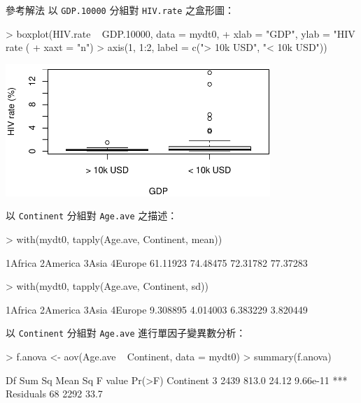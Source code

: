 \documentclass[14pt, aspectratio=43]{beamer}
\begin{document}
\begin{frame}{參考解法}
以 \verb+GDP.10000+ 分組對 \verb+HIV.rate+ 之盒形圖：
\begin{RC}
> boxplot(HIV.rate ~ GDP.10000, data = mydt0,
+         xlab = "GDP", ylab = "HIV rate (%
+         xaxt = "n")
> axis(1, 1:2, label = c("> 10k USD", "< 10k USD"))
\end{RC}
\begin{center}\includegraphics[width=0.75\textwidth]{Rplot-test-two-group.pdf}\end{center}

\framebreak

以 \verb+Continent+ 分組對 \verb+Age.ave+ 之描述：
\begin{RC}
> with(mydt0, {tapply(Age.ave, Continent, mean)})
\end{RC}
\begin{R}
 1Africa 2America    3Asia  4Europe 
61.11923 74.48475 72.31782 77.37283 
\end{R}
\begin{RC}
> with(mydt0, {tapply(Age.ave, Continent, sd)})
\end{RC}
\begin{R}
 1Africa 2America    3Asia  4Europe 
9.308895 4.014003 6.383229 3.820449
\end{R}

\framebreak

以 \verb+Continent+ 分組對 \verb+Age.ave+ 進行單因子變異數分析：
\begin{RC}
> f.anova <- aov(Age.ave ~ Continent, data = mydt0)
> summary(f.anova)
\end{RC}
\begin{R}
            Df Sum Sq Mean Sq F value   Pr(>F)    
Continent    3   2439   813.0   24.12 9.66e-11 ***
Residuals   68   2292    33.7                     
\end{R}


\end{frame}
\end{document}
